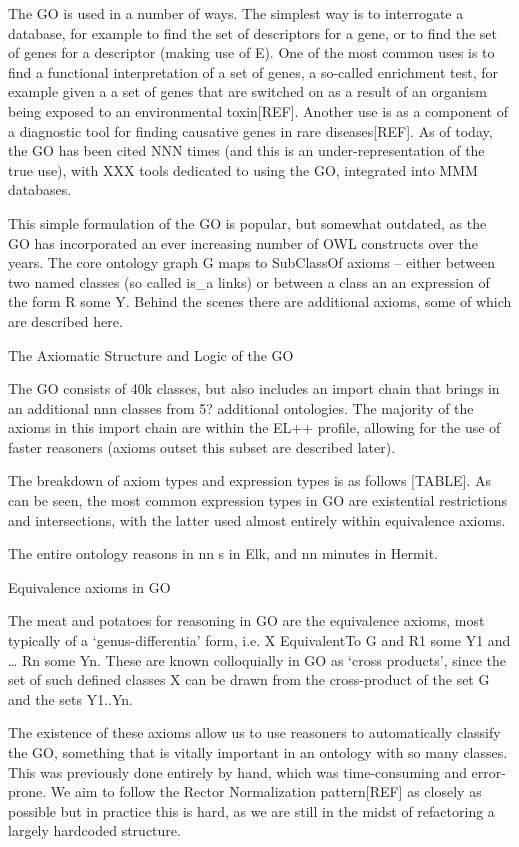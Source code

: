 \documentclass{llncs}
\begin{document}
The GO is used in a number of ways. The simplest way is to interrogate a database, for example to find the set of descriptors for a gene, or to find the set of genes for a descriptor (making use of E). One of the most common uses is to find a functional interpretation of a set of genes, a so-called enrichment test, for example given a a set of genes that are switched on as a result of an organism being exposed to an environmental toxin[REF]. Another use is as a component of a diagnostic tool for finding causative genes in rare diseases[REF]. As of today, the GO has been cited NNN times (and this is an under-representation of the true use), with XXX tools dedicated to using the GO, integrated into MMM databases.

This simple formulation of the GO is popular, but somewhat outdated, as the GO has incorporated an ever increasing number of OWL constructs over the years. The core ontology graph G maps to SubClassOf axioms -- either between two named classes (so called is\_a links) or between a class an an expression of the form R some Y. Behind the scenes there are additional axioms, some of which are described here.

The Axiomatic Structure and Logic of the GO

The GO consists of 40k classes, but also includes an import chain that brings in an additional nnn classes from 5? additional ontologies. The majority of the axioms in this import chain are within the EL++ profile, allowing for the use of faster reasoners (axioms outset this subset are described later).

The breakdown of axiom types and expression types is as follows [TABLE]. As can be seen, the most common expression types in GO are existential restrictions and intersections, with the latter used almost entirely within equivalence axioms.

The entire ontology reasons in nn s in Elk, and nn minutes in Hermit.

Equivalence axioms in GO

The meat and potatoes for reasoning in GO are the equivalence axioms, most typically of a ‘genus-differentia’ form, i.e. X EquivalentTo G and R1 some Y1 and … Rn some Yn. These are known colloquially in GO as ‘cross products’, since the set of such defined classes X can be drawn from the cross-product of the set G and the sets Y1..Yn.

The existence of these axioms allow us to use reasoners to automatically classify the GO, something that is vitally important in an ontology with so many classes. This was previously done entirely by hand, which was time-consuming and error-prone. We aim to follow the Rector Normalization pattern[REF] as closely as possible but in practice this is hard, as we are still in the midst of refactoring a largely hardcoded structure.
\end{document}
